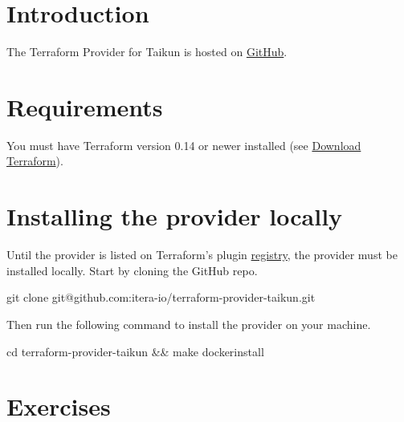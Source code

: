 \section{Introduction}
The Terraform Provider for Taikun is hosted on \href{https://github.com/itera-io/terraform-provider-taikun}{GitHub}.
\blindtext{}

\section{Requirements}
You must have Terraform version 0.14 or newer installed (see \href{https://www.terraform.io/downloads.html}{Download Terraform}).

\section{Installing the provider locally}
Until the provider is listed on Terraform's plugin \href{https://registry.terraform.io/browse/providers}{registry}, the provider must be installed locally.
Start by cloning the GitHub repo.
\begin{shell}
git clone git@github.com:itera-io/terraform-provider-taikun.git
\end{shell}
Then run the following command to install the provider on your machine.
\begin{shell}
cd terraform-provider-taikun && make dockerinstall
\end{shell}

\section{Exercises}
\blindtext{}
